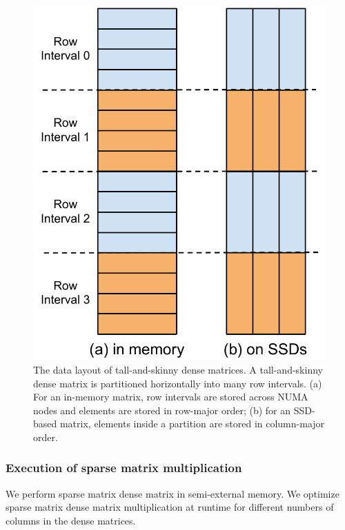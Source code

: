 \begin{figure}
\centering
\includegraphics[scale=0.4]{./dense_matrix.pdf}
\vspace{-5pt}
\caption{The data layout of tall-and-skinny dense matrices. A tall-and-skinny
dense matrix is partitioned horizontally into many row intervals.
(a) For an in-memory matrix, row intervals are stored across NUMA nodes and
elements are stored in row-major order; (b) for an SSD-based matrix, elements
inside a partition are stored in column-major order.}
\vspace{-5pt}
\label{dense_mat}
\end{figure}

\subsubsection{Execution of sparse matrix multiplication} \label{sec:exec}
We perform sparse matrix dense matrix in semi-external memory.
We optimize sparse matrix dense matrix multiplication at runtime for different
numbers of columns in the dense matrices.

